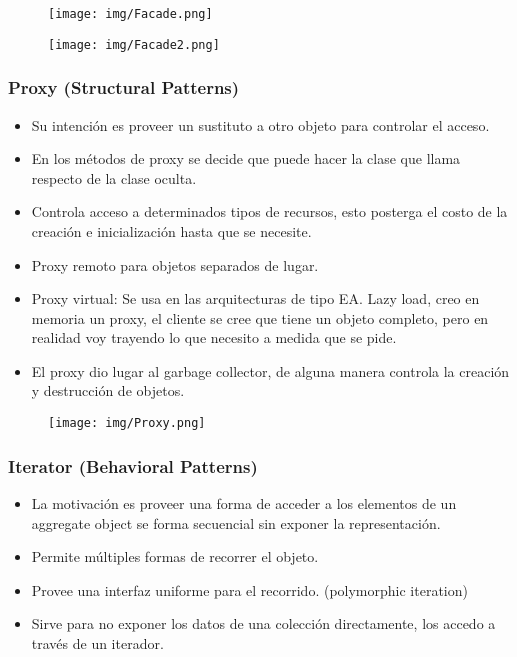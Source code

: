 \begin{figure}[!htb]
    \centering
    \texttt{[image: img/Facade.png]}
\end{figure}

\begin{figure}[!htb]
    \centering
    \texttt{[image: img/Facade2.png]}
\end{figure}

\subsubsection*{Proxy (Structural Patterns)}
\begin{itemize}
\item Su intención es proveer un sustituto a otro objeto para controlar el acceso.
\item En los métodos de proxy se decide que puede hacer la clase que llama respecto de la clase oculta.
\item Controla acceso a determinados tipos de recursos, esto posterga el costo de la creación e inicialización hasta que se necesite.
\item Proxy remoto para objetos separados de lugar.
\item Proxy virtual: Se usa en las arquitecturas de tipo EA. Lazy load, creo en memoria un proxy, el cliente se cree que tiene un objeto completo, pero en realidad voy trayendo lo que necesito a medida que se pide.
\item El proxy dio lugar al garbage collector, de alguna manera controla la creación y destrucción de objetos.
\end{itemize}

\begin{figure}[!htb]
    \centering
    \texttt{[image: img/Proxy.png]}
\end{figure}

\subsubsection*{Iterator (Behavioral Patterns)}
\begin{itemize}
\item La motivación es proveer una forma de acceder a los elementos de un aggregate object se forma secuencial sin exponer la representación.
\item Permite múltiples formas de recorrer el objeto.
\item Provee una interfaz uniforme para el recorrido. (polymorphic iteration)
\item Sirve para no exponer los datos de una colección directamente, los accedo a través de un iterador.
\end{itemize}

